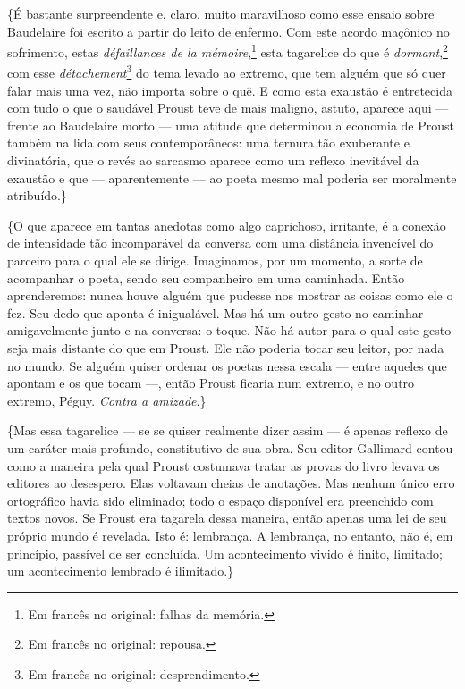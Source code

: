 \{É bastante surpreendente e, claro, muito maravilhoso como esse ensaio
sobre Baudelaire foi escrito a partir do leito de enfermo. Com este
acordo maçônico no sofrimento, estas \emph{défaillances de la mémoire},\footnote{Em francês no original: falhas da memória. \versal{[N. T.]}} esta
tagarelice do que é \emph{dormant},\footnote{Em francês no
  original: repousa. \versal{[N. T.]}} com esse \emph{détachement}\footnote{Em francês no original: desprendimento. \versal{[N. T.]}} do tema levado ao
extremo, que tem alguém que só quer falar mais uma vez, não importa
sobre o quê. E como esta exaustão é entretecida com tudo o que o
saudável Proust teve de mais maligno, astuto, aparece aqui --- frente ao
Baudelaire morto --- uma atitude que determinou a economia de Proust
também na lida com seus contemporâneos: uma ternura tão exuberante e
divinatória, que o revés ao sarcasmo aparece como um reflexo inevitável
da exaustão e que --- aparentemente --- ao poeta mesmo mal poderia ser
moralmente atribuído.\}

\{O que aparece em tantas anedotas como algo caprichoso, irritante, é a
conexão de intensidade tão incomparável da conversa com uma distância
invencível do parceiro para o qual ele se dirige. Imaginamos, por um
momento, a sorte de acompanhar o poeta, sendo seu companheiro em uma
caminhada. Então aprenderemos: nunca houve alguém que pudesse nos
mostrar as coisas como ele o fez. Seu dedo que aponta é inigualável. Mas
há um outro gesto no caminhar amigavelmente junto e na conversa: o
toque. Não há autor para o qual este gesto seja mais distante do que em
Proust. Ele não poderia tocar seu leitor, por nada no mundo. Se alguém
quiser ordenar os poetas nessa escala --- entre aqueles que apontam e os
que tocam ---, então Proust ficaria num extremo, e no outro extremo,
Péguy. \emph{Contra a amizade}.\}

\{Mas essa tagarelice --- se se quiser realmente dizer assim --- é apenas
reflexo de um caráter mais profundo, constitutivo de sua obra. Seu
editor Gallimard contou como a maneira pela qual Proust costumava tratar
as provas do livro levava os editores ao desespero. Elas voltavam
cheias de anotações. Mas nenhum único erro ortográfico havia sido
eliminado; todo o espaço disponível era preenchido com textos novos. Se
Proust era tagarela dessa maneira, então apenas uma lei de seu próprio
mundo é revelada. Isto é: lembrança. A lembrança, no entanto, não é, em
princípio, passível de ser concluída. Um acontecimento vivido é finito,
limitado; um acontecimento lembrado é ilimitado.\}


